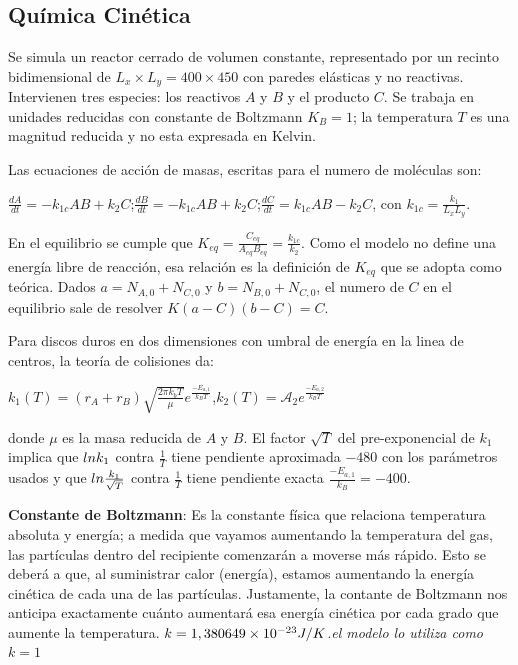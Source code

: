 \documentclass{article}
\begin{document}
\subsection{Química Cinética}
Se simula un reactor cerrado de volumen constante, representado por un recinto bidimensional de $L_x \times L_y=400\times 450$ con paredes elásticas y no reactivas. Intervienen tres especies: los reactivos $A$ y $B$ y el producto $C$. Se trabaja en unidades reducidas con constante de Boltzmann $K_B=1$; la temperatura $T$ es una magnitud reducida y no esta expresada en Kelvin.

Las ecuaciones de acción de masas, escritas para el numero de moléculas son:
\begin{center}
$\frac{dA}{dt}=-k_{1c}AB+k_2C$;\quad$\frac{dB}{dt}=-k_{1c}AB+k_2C$;\quad$\frac{dC}{dt}=k_{1c}AB-k_2C$, con $k_{1c}=\frac{k_1}{L_xL_y}$.
\end{center}
En el equilibrio se cumple que $K_{eq}=\frac{C_{eq}}{A_{eq}B_{eq}}=\frac{k_{1c}}{k_2}$. Como el modelo no define una energía libre de reacción, esa relación es la definición de $K_{eq}$ que se adopta como teórica. Dados $a=N_{A,0}+N_{C,0}$ y $b=N_{B,0}+N_{C,0}$, el numero de $C$ en el equilibrio sale de resolver $K(a-C)(b-C)=C$.

Para discos duros en dos dimensiones con umbral de energía en la linea de centros, la teoría de colisiones da:
\begin{center}
$k_1(T)=(r_A+r_B)\sqrt{\frac{2\pi k_bT}{\mu}}e^{\frac{-E_{a,1}}{k_BT}}$,\quad  $k_2(T)=\mathcal{A}_2e^{\frac{-E_{a,2}}{k_BT}}$
\end{center}
donde $\mu$ es la masa reducida de $A$ y $B$. El factor $\sqrt{T}$ del pre-exponencial de $k_1$ implica que $ln\space k_1$ contra $\frac{1}{T}$ tiene pendiente aproximada $-480$ con los parámetros usados y que $ln\space \frac{k_1}{\sqrt{T}}$ contra $\frac{1}{T}$ tiene pendiente exacta $\frac{-E_{a,1}}{k_B}=-400$.

\textbf{Constante de Boltzmann}: Es la constante física que relaciona temperatura absoluta y energía; a medida que vayamos aumentando la temperatura del gas, las partículas dentro del recipiente comenzarán a moverse más rápido. Esto se deberá a que, al suministrar calor (energía), estamos aumentando la energía cinética de cada una de las partículas. Justamente, la contante de Boltzmann nos anticipa exactamente cuánto aumentará esa energía cinética por cada grado que aumente la temperatura. $k=1,380649\times 10^{-23}\space J/K$.\quad \textit{el modelo lo utiliza como $k=1$}
\end{document}
